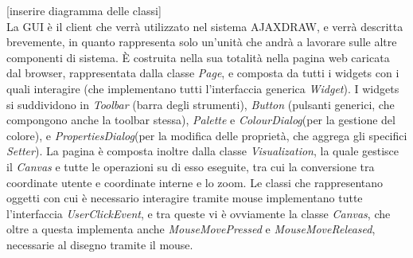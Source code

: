[inserire diagramma delle classi] \\
La GUI \` e  il client che verr\` a utilizzato nel sistema AJAXDRAW, e verr\` a descritta brevemente, in quanto rappresenta solo un'unit\` a che andr\`  a a lavorare sulle altre componenti di sistema. \` E costruita nella sua totalit\` a nella pagina web caricata dal browser, rappresentata dalla classe \textit{Page}, e composta da tutti i widgets con i quali interagire (che implementano tutti l'interfaccia generica \textit{Widget}).  I widgets si suddividono in \textit{Toolbar} (barra degli strumenti), \textit{Button} (pulsanti generici, che compongono anche la toolbar stessa), \textit{Palette} e \textit{ColourDialog}(per la gestione del colore), e \textit{PropertiesDialog}(per la modifica delle propriet\` a, che aggrega gli specifici \textit{Setter}). La pagina \` e composta inoltre dalla classe \textit{Visualization}, la quale gestisce il \textit{Canvas} e tutte le operazioni su di esso eseguite, tra cui la conversione tra coordinate utente e coordinate interne e lo zoom. Le classi che rappresentano oggetti con cui \`e necessario interagire tramite mouse implementano tutte l'interfaccia \textit{UserClickEvent}, e tra queste vi \` e ovviamente la classe \textit{Canvas}, che oltre a questa implementa anche \textit{MouseMovePressed} e \textit{MouseMoveReleased}, necessarie al disegno tramite il mouse.  

